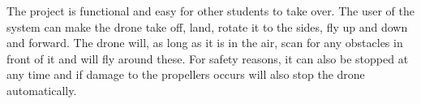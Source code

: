 \documentclass[Main]{subfiles}
\begin{document}
The project is functional and easy for other students to take over.
The user of the system can make the drone take off, land, rotate it to the sides, fly up and down and forward.
The drone will, as long as it is in the air, scan for any obstacles in front of it and will fly around these.
For safety reasons, it can also be stopped at any time and if damage to the propellers occurs will also stop the drone automatically.
\end{document}
